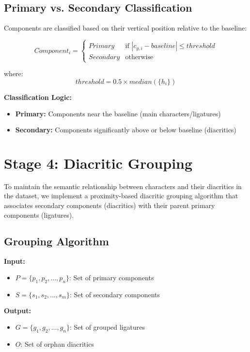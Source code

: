 \documentclass[12pt,a4paper,oneside]{report}
\begin{document}
\subsection{Primary vs. Secondary Classification}

Components are classified based on their vertical position relative to the baseline:

\begin{equation}
    Component_i = 
    \begin{cases}
        Primary & \text{if } |c_{y,i} - baseline| \leq threshold \\
        Secondary & \text{otherwise}
    \end{cases}
\end{equation}

where:
\begin{equation}
    threshold = 0.5 \times median(\{h_i\})
\end{equation}

\textbf{Classification Logic:}
\begin{itemize}
    \item \textbf{Primary:} Components near the baseline (main characters/ligatures)
    \item \textbf{Secondary:} Components significantly above or below baseline (diacritics)
\end{itemize}

\section{Stage 4: Diacritic Grouping}

To maintain the semantic relationship between characters and their diacritics in the dataset, we implement a proximity-based diacritic grouping algorithm that associates secondary components (diacritics) with their parent primary components (ligatures).

\subsection{Grouping Algorithm}

\textbf{Input:}
\begin{itemize}
    \item $P = \{p_1, p_2, ..., p_n\}$: Set of primary components
    \item $S = \{s_1, s_2, ..., s_m\}$: Set of secondary components
\end{itemize}

\textbf{Output:}
\begin{itemize}
    \item $G = \{g_1, g_2, ..., g_n\}$: Set of grouped ligatures
    \item $O$: Set of orphan diacritics
\end{itemize}
\end{document}
